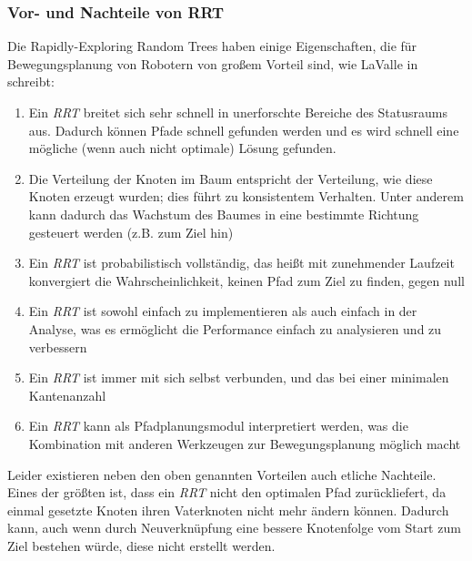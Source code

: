 \subsubsection{Vor- und Nachteile von RRT}
Die Rapidly-Exploring Random Trees haben einige Eigenschaften, die für Bewegungsplanung von Robotern von großem Vorteil sind, wie LaValle in  \citep[Kapitel 3 in][]{Lav98} schreibt:
\begin{enumerate}
\item Ein \textit{RRT} breitet sich sehr schnell in unerforschte Bereiche des Statusraums aus. Dadurch können Pfade schnell gefunden werden und es wird schnell eine mögliche (wenn auch nicht optimale) Lösung gefunden.
\item Die Verteilung der Knoten im Baum entspricht der Verteilung, wie diese Knoten erzeugt wurden; dies führt zu konsistentem Verhalten. Unter anderem kann dadurch das Wachstum des Baumes in eine bestimmte Richtung gesteuert werden (z.B. zum Ziel hin)
\item Ein \textit{RRT} ist probabilistisch vollständig, das heißt mit zunehmender Laufzeit konvergiert die Wahrscheinlichkeit, keinen Pfad zum Ziel zu finden, gegen null
\item Ein \textit{RRT} ist sowohl einfach zu implementieren als auch einfach in der Analyse, was es ermöglicht die Performance einfach zu analysieren und zu verbessern
\item Ein \textit{RRT} ist immer mit sich selbst verbunden, und das bei einer minimalen Kantenanzahl
\item Ein \textit{RRT} kann als Pfadplanungsmodul interpretiert werden, was die Kombination mit anderen Werkzeugen zur Bewegungsplanung möglich macht
\end{enumerate}
Leider existieren neben den oben genannten Vorteilen auch etliche Nachteile. Eines der größten ist, dass ein \textit{RRT} nicht den optimalen Pfad zurückliefert, da einmal gesetzte Knoten ihren Vaterknoten nicht mehr ändern können. Dadurch kann, auch wenn durch Neuverknüpfung eine bessere Knotenfolge vom Start zum Ziel bestehen würde, diese nicht erstellt werden. \\

